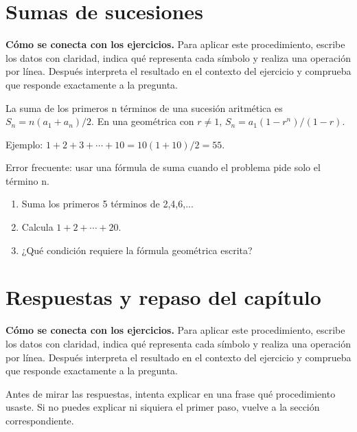 \documentclass[10pt,oneside,openany]{book}
\begin{document}
\section{Sumas de sucesiones}

\textbf{Cómo se conecta con los ejercicios.} Para aplicar este procedimiento, escribe los datos con claridad, indica qué representa cada símbolo y realiza una operación por línea. Después interpreta el resultado en el contexto del ejercicio y comprueba que responde exactamente a la pregunta.

La suma de los primeros n términos de una sucesión aritmética es $S_n=n(a_1+a_n)/2$. En una geométrica con $r\neq1$, $S_n=a_1(1-r^n)/(1-r)$.

\begin{ejemplo}
Ejemplo: $1+2+3+\cdots+10=10(1+10)/2=55$.
\end{ejemplo}

\begin{ojo}
Error frecuente: usar una fórmula de suma cuando el problema pide solo el término n.
\end{ojo}

\begin{practica}

\begin{enumerate}

\item Suma los primeros 5 términos de 2,4,6,...

\item Calcula $1+2+\cdots+20$.

\item ¿Qué condición requiere la fórmula geométrica escrita?

\end{enumerate}

\end{practica}



\section{Respuestas y repaso del capítulo}

\textbf{Cómo se conecta con los ejercicios.} Para aplicar este procedimiento, escribe los datos con claridad, indica qué representa cada símbolo y realiza una operación por línea. Después interpreta el resultado en el contexto del ejercicio y comprueba que responde exactamente a la pregunta.

Antes de mirar las respuestas, intenta explicar en una frase qué procedimiento usaste. Si no puedes explicar ni siquiera el primer paso, vuelve a la sección correspondiente.
\end{document}
